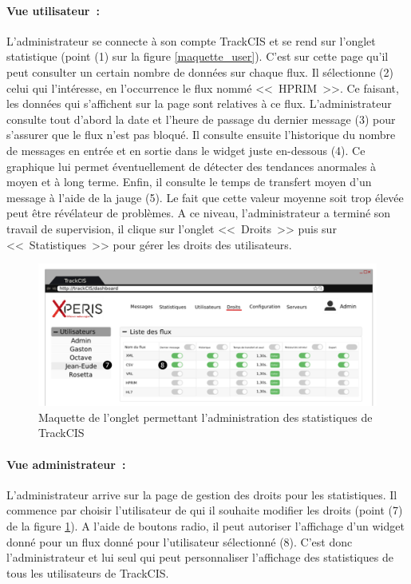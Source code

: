 			\paragraph{Vue utilisateur~:}
			L'administrateur se connecte à son compte TrackCIS et se rend sur l'onglet
			statistique (point (1) sur la figure \ref{maquette_user}). C'est sur cette
			page qu'il peut consulter un certain nombre de données sur chaque flux. Il
			sélectionne (2) celui qui l'intéresse, en l'occurrence le flux nommé
			<<~HPRIM~>>.
			Ce faisant, les données qui s'affichent sur la page sont relatives à ce flux.
			L'administrateur consulte tout d'abord la date et l'heure de passage du
			dernier message (3) pour s'assurer que le flux n'est pas bloqué. Il consulte ensuite
			l'historique du nombre de messages en entrée et en sortie dans le widget
			juste en-dessous (4). Ce graphique lui permet éventuellement de détecter des
			tendances anormales à moyen et à long terme. Enfin, il consulte le temps de
			transfert moyen d'un message à l'aide de la jauge (5). Le fait que cette
			valeur moyenne soit trop élevée peut être révélateur de problèmes. A ce
			niveau, l'administrateur a terminé son travail de supervision, il clique sur
			l'onglet <<~Droits~>> puis sur <<~Statistiques~>> pour gérer les droits des
			utilisateurs.
			
			\begin{figure}[H]
				\centering
				\includegraphics[width=16cm]{../img/part2/maquette_admin_1.png}
				\caption{\label{maquette_admin} Maquette de l'onglet permettant
				l'administration des statistiques de TrackCIS}
			\end{figure}
			
			\paragraph{Vue administrateur~:}
			L'administrateur arrive sur la page de gestion des droits pour les
			statistiques. Il commence par choisir l'utilisateur de qui il souhaite
			modifier les droits (point (7) de la figure \ref{maquette_admin}). A l'aide
			de boutons radio, il peut autoriser l'affichage d'un widget donné pour un
			flux donné pour l'utilisateur sélectionné (8). C'est donc l'administrateur
			et lui seul qui peut personnaliser l'affichage des statistiques de tous les
			utilisateurs de TrackCIS.
			